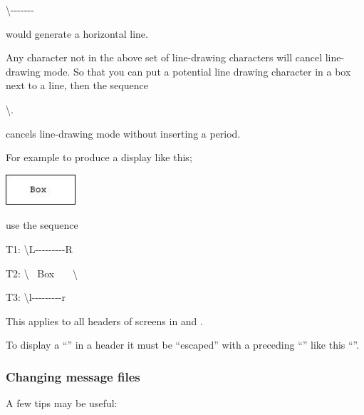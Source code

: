 \begin{expara}

{\textbackslash}-{}-{}-{}-{}-{}-{}-

\end{expara}

would generate a horizontal line.

Any character not in the above set of line-drawing characters will cancel line-drawing mode. So that you can put a potential line drawing
character in a box next to a line, then the sequence

\begin{expara}

{\textbackslash}.

\end{expara}

cancels line-drawing mode without inserting a period.

For example to produce a display like this;

 \includegraphics[width=2.589cm,height=1.138cm]{img/ref53.jpg} 

use the sequence

\begin{expara}

T1: {\textbackslash}L-{}-{}-{}-{}-{}-{}-{}-{}-R

T2: {\textbackslash}{\textbar} \ Box \ \ \ {\textbackslash}{\textbar}

T3: {\textbackslash}l-{}-{}-{}-{}-{}-{}-{}-{}-r

\end{expara}

This applies to all headers of screens in \PrBtq{} and \PrBtuser{}.

To display a ``\exampletext{{\textbackslash}}'' in a header it must be ``escaped'' with a preceding
``\exampletext{{\textbackslash}}'' like this ``\exampletext{{\textbackslash}{\textbackslash}}''.

\subsubsection{Changing message files}
A few tips may be useful:

